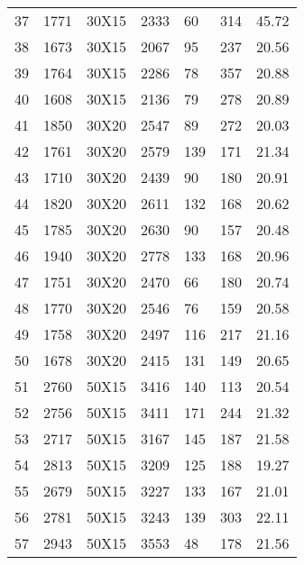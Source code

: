 \documentclass[14pt]{acmsiggraph}
\begin{document}
\begin{table}[h!]
\begin{center}
{\begin{tabular}{lllllll||}
					37  & 1771 & 30X15  & \cellcolor[rgb]{0.79,0.83,0.42}2333 & 60  & 314  & 45.72 \\
					38  & 1673 & 30X15  & \cellcolor[rgb]{0.7,0.79,0.38}2067  & 95  & 237  & 20.56 \\
					39  & 1764 & 30X15  & \cellcolor[rgb]{0.76,0.81,0.41}2286 & 78  & 357  & 20.88 \\
					40  & 1608 & 30X15  & \cellcolor[rgb]{0.8,0.83,0.43}2136  & 79  & 278  & 20.89 \\
					41  & 1850 & 30X20  & \cellcolor[rgb]{0.85,0.85,0.45}2547 & 89  & 272  & 20.03 \\
					42  & 1761 & 30X20  & \cellcolor[rgb]{0.95,0.9,0.49}2579  & 139 & 171  & 21.34 \\
					43  & 1710 & 30X20  & \cellcolor[rgb]{0.91,0.88,0.48}2439 & 90  & 180  & 20.91 \\
					44  & 1820 & 30X20  & \cellcolor[rgb]{0.92,0.88,0.48}2611 & 132 & 168  & 20.62 \\
					45  & 1785 & 30X20  & \cellcolor[rgb]{0.96,0.9,0.5}2630   & 90  & 157  & 20.48 \\
					46  & 1940 & 30X20  & \cellcolor[rgb]{0.92,0.88,0.48}2778 & 133 & 168  & 20.96 \\
					47  & 1751 & 30X20  & \cellcolor[rgb]{0.89,0.87,0.47}2470 & 66  & 180  & 20.74 \\
					48  & 1770 & 30X20  & \cellcolor[rgb]{0.92,0.89,0.48}2546 & 76  & 159  & 20.58 \\
					49  & 1758 & 30X20  & \cellcolor[rgb]{0.9,0.88,0.47}2497  & 116 & 217  & 21.16 \\
					50  & 1678 & 30X20  & \cellcolor[rgb]{0.92,0.89,0.48}2415 & 131 & 149  & 20.65 \\
					51  & 2760 & 50X15  & \cellcolor[rgb]{0.7,0.79,0.38}3416  & 140 & 113  & 20.54 \\
					52  & 2756 & 50X15  & \cellcolor[rgb]{0.7,0.79,0.38}3411  & 171 & 244  & 21.32 \\
					53  & 2717 & 50X15  & \cellcolor[rgb]{0.62,0.75,0.35}3167 & 145 & 187  & 21.58 \\
					54  & 2813 & 50X15  & \cellcolor[rgb]{0.59,0.74,0.34}3209 & 125 & 188  & 19.27 \\
					55  & 2679 & 50X15  & \cellcolor[rgb]{0.66,0.77,0.37}3227 & 133 & 167  & 21.01 \\
					56  & 2781 & 50X15  & \cellcolor[rgb]{0.62,0.75,0.35}3243 & 139 & 303  & 22.11 \\
					57  & 2943 & 50X15  & \cellcolor[rgb]{0.67,0.77,0.37}3553 & 48  & 178  & 21.56 \\

\end{tabular}}
\end{center}
\end{table}
\end{document}
